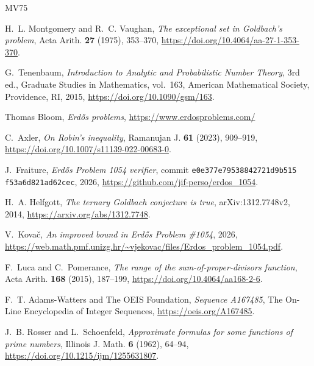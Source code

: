 \begin{thebibliography}{MV75}

H.~L. Montgomery and R.~C. Vaughan,
\emph{The exceptional set in Goldbach's problem},
Acta Arith. \textbf{27} (1975), 353--370,
\url{https://doi.org/10.4064/aa-27-1-353-370}.

G.~Tenenbaum,
\emph{Introduction to Analytic and Probabilistic Number Theory}, 3rd ed.,
Graduate Studies in Mathematics, vol.~163,
American Mathematical Society, Providence, RI, 2015,
\url{https://doi.org/10.1090/gsm/163}.

Thomas Bloom, \emph{Erd\H{o}s problems}, \url{https://www.erdosproblems.com/}

C.~Axler,
\emph{On Robin's inequality},
Ramanujan J. \textbf{61} (2023), 909--919,
\url{https://doi.org/10.1007/s11139-022-00683-0}.

J.~Fraiture,
\emph{Erd\H{o}s Problem 1054 verifier},
commit \texttt{e0e377e79538842721d9b515}%
\allowbreak\texttt{f53a6d821ad62cec},
2026,
\url{https://github.com/jif-perso/erdos_1054}.

H.~A. Helfgott,
\emph{The ternary Goldbach conjecture is true},
arXiv:1312.7748v2, 2014,
\url{https://arxiv.org/abs/1312.7748}.

V.~Kova\v{c},
\emph{An improved bound in Erd\H{o}s Problem \#1054},
2026,
\url{https://web.math.pmf.unizg.hr/~vjekovac/files/Erdos_problem_1054.pdf}.

F.~Luca and C.~Pomerance,
\emph{The range of the sum-of-proper-divisors function},
Acta Arith. \textbf{168} (2015), 187--199,
\url{https://doi.org/10.4064/aa168-2-6}.

F.~T. Adams-Watters and The OEIS Foundation,
\emph{Sequence A167485},
The On-Line Encyclopedia of Integer Sequences,
\url{https://oeis.org/A167485}.

J.~B. Rosser and L.~Schoenfeld,
\emph{Approximate formulas for some functions of prime numbers},
Illinois J. Math. \textbf{6} (1962), 64--94,
\url{https://doi.org/10.1215/ijm/1255631807}.


\end{thebibliography}
